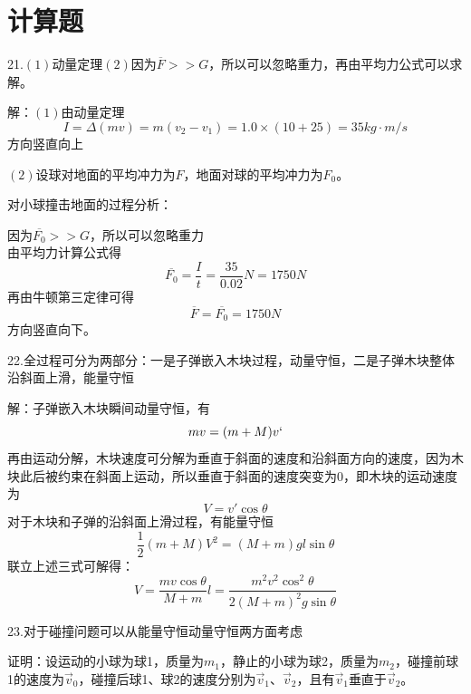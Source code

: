 \documentclass[b5paper,opensource]{./template/qyxf-book}
\begin{document}
	\section{计算题}
		21.\analysis $(1)$动量定理$(2)$因为$\overline{F}>>G$，所以可以忽略重力，再由平均力公式可以求解。
		
		解：$(1)$由动量定理
		\begin{equation*}
		I=\Delta(mv)=m(v_2-v_1)=1.0\times(10+25)=35kg\cdot m/s
		\end{equation*}
		方向竖直向上
		
		$(2)$设球对地面的平均冲力为$F$，地面对球的平均冲力为$F_0$。
		
		对小球撞击地面的过程分析：
		
		因为$\overline{F_0}>>G$，所以可以忽略重力\\
		由平均力计算公式得
		\begin{equation*}
		\overline{F_0}=\frac{I}{t}=\frac{35}{0.02}N=1750N
		\end{equation*}
		再由牛顿第三定律可得
		\begin{equation*}
		\overline{F}=\overline{F_0}=1750N
		\end{equation*}
		方向竖直向下。
		
		22.\analysis 全过程可分为两部分：一是子弹嵌入木块过程，动量守恒，二是子弹木块整体沿斜面上滑，能量守恒
		
		解：子弹嵌入木块瞬间动量守恒，有
		\begin{equation*}
		mv=(m+M)v`
		\end{equation*}
		再由运动分解，木块速度可分解为垂直于斜面的速度和沿斜面方向的速度，因为木块此后被约束在斜面上运动，所以垂直于斜面的速度突变为$0$，即木块的运动速度为
		\begin{equation*}
		V=v'\cos\theta
		\end{equation*}
		对于木块和子弹的沿斜面上滑过程，有能量守恒
		\begin{equation*}
		\frac{1}{2}(m+M)V^2=(M+m)gl\sin\theta
		\end{equation*}
		联立上述三式可解得：
		\begin{equation*}
		V=\frac{mv\cos\theta}{M+m}
		l=\frac{m^2v^2\cos^2\theta}{2(M+m)^2g\sin\theta}
		\end{equation*}
		
		23.\analysis 对于碰撞问题可以从能量守恒动量守恒两方面考虑
		
		证明：设运动的小球为球1，质量为$m_1$，静止的小球为球2，质量为$m_2$，碰撞前球1的速度为$\vec{v}_0$，碰撞后球1、球2的速度分别为$\vec{v}_1$、$\vec{v}_2$，且有$\vec{v}_1$垂直于$\vec{v}_2$。
		
\end{document}

